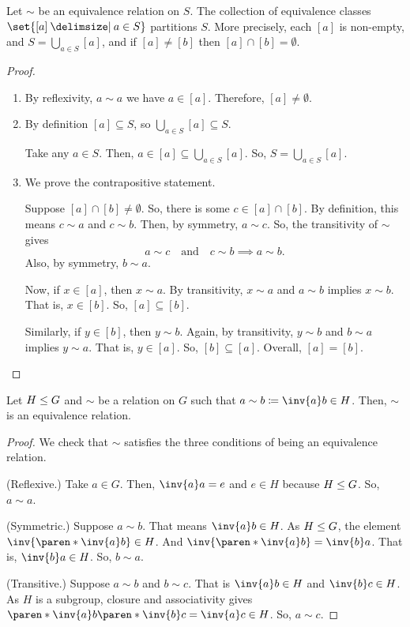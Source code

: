 \documentclass[11pt]{penrose}
\begin{document}
\begin{nthm}
    Let $\sim$ be an equivalence relation on $S$. The collection of equivalence classes $\set{[a] \st a \in S}$ partitions $S$. More precisely, each $[a]$ is non-empty, and $S = \bigcup_{a \in S} [a]$, and if $[a] \neq [b]$ then $[a] \cap [b] = \emptyset$.
\end{nthm}
\begin{proof}
    \phantom{}
    \begin{enumerate}
        \item By reflexivity, $a \sim a$ we have $a \in [a]$. Therefore, $[a] \neq \emptyset$.

        \item By definition $[a] \subseteq S$, so $\bigcup_{a \in S} [a] \subseteq S$.

        Take any $a \in S$. Then, $a \in [a] \subseteq \bigcup_{a \in S} [a]$. So, $S = \bigcup_{a \in S} [a]$.

        \item We prove the contrapositive statement.

        Suppose $[a] \cap [b] \neq \emptyset$. So, there is some $c \in [a] \cap [b]$. By definition, this means $c \sim a$ and $c \sim b$. Then, by symmetry, $a \sim c$. So, the transitivity of $\sim$ gives
        \begin{equation*}
            a \sim c \quad\text{and}\quad c \sim b \implies a \sim b.
        \end{equation*}
        Also, by symmetry, $b \sim a$.

        Now, if $x \in [a]$, then $x \sim a$. By transitivity, $x \sim a$ and $a \sim b$ implies $x \sim b$. That is, $x \in [b]$. So, $[a] \subseteq [b]$.

        Similarly, if $y \in [b]$, then $y \sim b$. Again, by transitivity, $y \sim b$ and $b \sim a$ implies $y \sim a$. That is, $y \in [a]$. So, $[b] \subseteq [a]$. Overall, $[a] = [b]$.\qedhere
    \end{enumerate}
\end{proof}

\begin{nthm}
    Let $H \mathrel{\leq} G$ and $\sim$ be a relation on $G$ such that $a \sim b \coloneq \inv{a} b \in H$. Then, $\sim$ is an equivalence relation.
\end{nthm}
\begin{proof}
    We check that $\sim$ satisfies the three conditions of being an equivalence relation.
    
    (Reflexive.) Take $a \in G$. Then, $\inv{a} a = e$ and $e \in H$ because $H \mathrel{\leq} G$. So, $a \sim a$.

    (Symmetric.) Suppose $a \sim b$. That means $\inv{a} b \in H$. As $H \mathrel{\leq} G$, the element $\inv{\paren*{\inv{a} b}} \in H$. And $\inv{\paren*{\inv{a} b}} = \inv{b} a$. That is, $\inv{b} a \in H$. So, $b \sim a$.

    (Transitive.) Suppose $a \sim b$ and $b \sim c$. That is $\inv{a} b \in H$ and $\inv{b} c \in H$. As $H$ is a subgroup, closure and associativity gives $\paren*{\inv{a} b} \paren*{\inv{b} c} = \inv{a} c \in H$. So, $a \sim c$. \qedhere
\end{proof}
\end{document}
